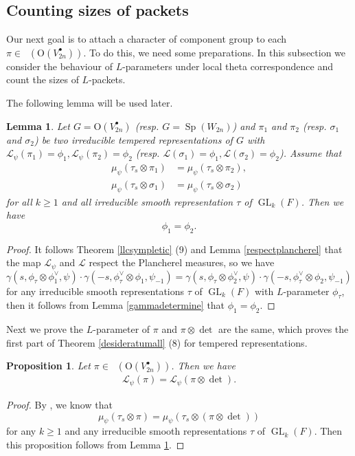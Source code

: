 \documentclass[article]{article}
\numberwithin{equation}{section}
\newtheorem{lemma}[theorem]{Lemma}
\newtheorem{proposition}[theorem]{Proposition}
\theoremstyle{definition}
\DeclareMathOperator{\GL}{GL}
\DeclareMathOperator{\SP}{Sp}
\DeclareMathOperator{\Irrt}{Irr_{temp}}
\begin{document}
\subsection{Counting sizes of packets}
Our next goal is to attach a character of component group to each $\pi\in \Irrt(\mathrm O(V_{2n}^\bullet))$. To do this, we need some
preparations. In this subsection we consider the behaviour of $L$-parameters under local theta correspondence and count the sizes of $L$-packets.

The following lemma will be used later. 
\begin{lemma}\label{plancherel}
	Let $G=\mathrm O(V^\bullet_{2n})$ (resp. $G=\SP(W_{2n})$) and $\pi_1$ and $\pi_2$ (resp. $\sigma_1$ and $\sigma_2$) be two irreducible tempered representations of $G$ with $\mathcal L_{\psi}(\pi_1)=\phi_1, \mathcal L_{\psi}(\pi_2)=\phi_2$ (resp. $\mathcal L(\sigma_1)=\phi_1, \mathcal L(\sigma_2)=\phi_2$). Assume that 
	\begin{align*}
	\mu_{\psi}(\tau_{s}\otimes \pi_1)&=\mu_{\psi}(\tau_s\otimes \pi_2),\\
    \mu_{\psi}(\tau_{s}\otimes \sigma_1)&=\mu_{\psi}(\tau_s\otimes \sigma_2) 
	\end{align*}
	for all $k\geq 1$ and all irreducible smooth representation $\tau$ of $\GL_{k}(F)$. Then we have 
	$$
	\phi_1=\phi_2. 
	$$
\end{lemma}
\begin{proof}
	It follows Theorem \ref{llcsympletic} (9) and Lemma \ref{respectplancherel} that the map $\mathcal L_\psi$ and $\mathcal L$ respect the Plancherel measures, so we have  
	$$
    \gamma\left(s, \phi_{\tau} \otimes \phi_1^{\vee}, \psi\right) \cdot \gamma\left(-s, \phi_{\tau}^{\vee} \otimes \phi_1, \psi_{-1}\right) =
     \gamma\left(s, \phi_{\tau} \otimes \phi_2^{\vee}, \psi\right) \cdot \gamma\left(-s, \phi_{\tau}^{\vee} \otimes \phi_2, \psi_{-1}\right) 
	$$
	for any irreducible smooth representations $\tau$ of $\GL_k(F)$ with $L$-parameter $\phi_\tau$, then it follows from Lemma \ref{gammadetermine} that $\phi_1=\phi_2$.  
\end{proof}

Next we prove the $L$-parameter of $\pi$ and $\pi\otimes \det$ are the same, which proves the first part of Theorem \ref{desideratumall} (8) for tempered representations. 
\begin{proposition}\label{det}
Let $\pi\in \Irrt(\mathrm O(V^\bullet_{2n}))$. Then we have  
\begin{align*}
\mathcal L_{\psi}(\pi)=\mathcal L_{\psi}(\pi\otimes\det). 
\end{align*}
\end{proposition}
\begin{proof}
	By \cite[Lemma B.1]{MR3166215}, we know that  
	$$\mu_{\psi}(\tau_s \otimes \pi)= \mu_{\psi}(\tau_s \otimes (\pi\otimes \det))$$
	for any $k\geq 1$ and any irreducible smooth representations $\tau$ of $\GL_k(F)$. Then this proposition follows from Lemma \ref{plancherel}.
\end{proof}
\end{document}
